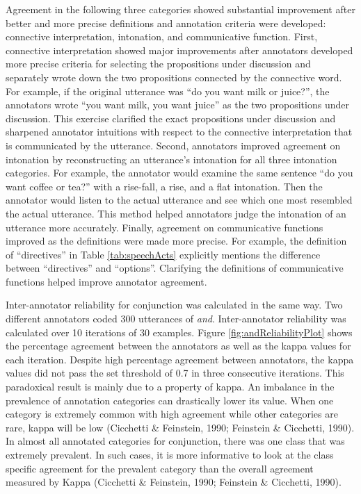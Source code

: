 \documentclass[floatsintext,man]{apa6}
\theoremstyle{definition}
\theoremstyle{definition}
\theoremstyle{definition}
\theoremstyle{remark}
\begin{document}
Agreement in the following three categories showed substantial
improvement after better and more precise definitions and annotation
criteria were developed: connective interpretation, intonation, and
communicative function. First, connective interpretation showed major
improvements after annotators developed more precise criteria for
selecting the propositions under discussion and separately wrote down
the two propositions connected by the connective word. For example, if
the original utterance was \enquote{do you want milk or juice?}, the
annotators wrote \enquote{you want milk, you want juice} as the two
propositions under discussion. This exercise clarified the exact
propositions under discussion and sharpened annotator intuitions with
respect to the connective interpretation that is communicated by the
utterance. Second, annotators improved agreement on intonation by
reconstructing an utterance's intonation for all three intonation
categories. For example, the annotator would examine the same sentence
\enquote{do you want coffee or tea?} with a rise-fall, a rise, and a
flat intonation. Then the annotator would listen to the actual utterance
and see which one most resembled the actual utterance. This method
helped annotators judge the intonation of an utterance more accurately.
Finally, agreement on communicative functions improved as the
definitions were made more precise. For example, the definition of
\enquote{directives} in Table \ref{tab:speechActs} explicitly mentions
the difference between \enquote{directives} and \enquote{options}.
Clarifying the definitions of communicative functions helped improve
annotator agreement.

Inter-annotator reliability for conjunction was calculated in the same
way. Two different annotators coded 300 utterances of \emph{and}.
Inter-annotator reliability was calculated over 10 iterations of 30
examples. Figure \ref{fig:andReliabilityPlot} shows the percentage
agreement between the annotators as well as the kappa values for each
iteration. Despite high percentage agreement between annotators, the
kappa values did not pass the set threshold of 0.7 in three consecutive
iterations. This paradoxical result is mainly due to a property of
kappa. An imbalance in the prevalence of annotation categories can
drastically lower its value. When one category is extremely common with
high agreement while other categories are rare, kappa will be low
(Cicchetti \& Feinstein, 1990; Feinstein \& Cicchetti, 1990). In almost
all annotated categories for conjunction, there was one class that was
extremely prevalent. In such cases, it is more informative to look at
the class specific agreement for the prevalent category than the overall
agreement measured by Kappa (Cicchetti \& Feinstein, 1990; Feinstein \&
Cicchetti, 1990).
\end{document}
